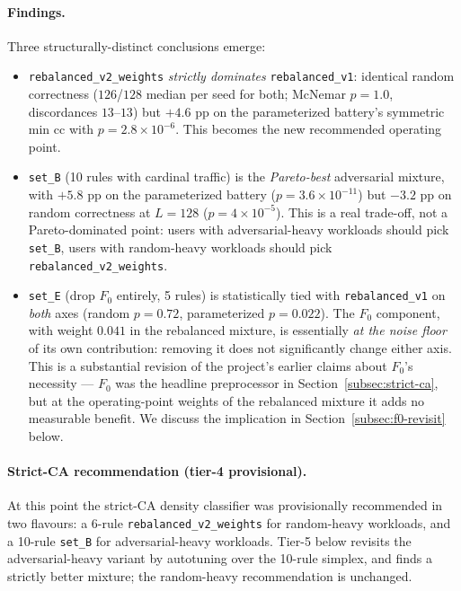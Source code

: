 \documentclass[11pt,a4paper]{article}
\begin{document}
\paragraph{Findings.}
Three structurally-distinct conclusions emerge:
\begin{itemize}
\item \texttt{rebalanced\_v2\_weights} \emph{strictly dominates}
  \texttt{rebalanced\_v1}: identical random correctness
  (\(126\)/\(128\) median per seed for both; McNemar
  \(p = 1.0\), discordances \(13\)--\(13\)) but \(+4.6\) pp on the
  parameterized battery's symmetric min cc with \(p = 2.8 \times
  10^{-6}\).  This becomes the new recommended operating point.
\item \texttt{set\_B} (10 rules with cardinal traffic) is the
  \emph{Pareto-best} adversarial mixture, with \(+5.8\) pp on the
  parameterized battery (\(p = 3.6 \times 10^{-11}\)) but \(-3.2\) pp
  on random correctness at \(L=128\) (\(p = 4 \times 10^{-5}\)).
  This is a real trade-off, not a Pareto-dominated point: users with
  adversarial-heavy workloads should pick \texttt{set\_B}, users with
  random-heavy workloads should pick \texttt{rebalanced\_v2\_weights}.
\item \texttt{set\_E} (drop \(F_0\) entirely, 5 rules) is
  statistically tied with \texttt{rebalanced\_v1} on \emph{both}
  axes (random \(p = 0.72\), parameterized \(p = 0.022\)).  The
  \(F_0\) component, with weight \(0.041\) in the rebalanced
  mixture, is essentially \emph{at the noise floor} of its own
  contribution: removing it does not significantly change either
  axis.  This is a substantial revision of the project's earlier
  claims about \(F_0\)'s necessity --- \(F_0\) was the headline
  preprocessor in Section~\ref{subsec:strict-ca}, but at the
  operating-point weights of the rebalanced mixture it adds
  no measurable benefit.  We discuss the implication in
  Section~\ref{subsec:f0-revisit} below.
\end{itemize}

\paragraph{Strict-CA recommendation (tier-4 provisional).}
At this point the strict-CA density classifier was provisionally
recommended in two flavours: a 6-rule \texttt{rebalanced\_v2\_weights}
for random-heavy workloads, and a 10-rule \texttt{set\_B} for
adversarial-heavy workloads.  Tier-5 below revisits the
adversarial-heavy variant by autotuning over the 10-rule simplex,
and finds a strictly better mixture; the random-heavy
recommendation is unchanged.
\end{document}
